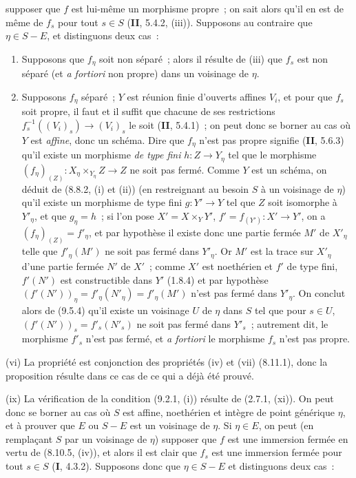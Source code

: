 
supposer que $f$ est lui-même un morphisme propre~; on sait alors qu'il en est
de même de $f_s$ pour tout $s\in S$ (\textbf{II}, 5.4.2, (iii)). Supposons au
contraire que $\eta\in S-E$, et distinguons deux cas~:

\begin{enumerate}[label=\upshape{$\arabic{enumi}^\circ$}]
  \item Supposons que $f_\eta$ soit non séparé~; alors il résulte de (iii) que
  $f_s$ est non séparé (et \emph{a fortiori} non propre) dans un voisinage de
  $\eta$.

  \item Supposons $f_\eta$ séparé~; $Y$ est réunion finie d'ouverts affines
  $V_i$, et pour que $f_s$ soit propre, il faut et il suffit que chacune de ses
  restrictions $f_s^{-1}((V_i)_s)\to(V_i)_s$ le soit (\textbf{II}, 5.4.1)~;
  on peut donc se borner au cas où $Y$ est \emph{affine}, donc un schéma. Dire
  que $f_\eta$ n'est pas propre signifie (\textbf{II}, 5.6.3) qu'il existe un
  morphisme \emph{de type fini} $h:Z\to Y_\eta$ tel que le morphisme
  $(f_\eta)_{(Z)}:X_\eta\times_{Y_\eta}Z\to Z$ ne soit pas fermé. Comme $Y$ est
  un schéma, on déduit de (8.8.2, (i) et (ii)) (en restreignant au besoin $S$ à
  un voisinage de $\eta$) qu'il existe un morphisme de type fini $g:Y'\to Y$
  tel que $Z$ soit isomorphe à $Y'_\eta$, et que $g_\eta=h$~; si l'on pose
  $X'=X\times_YY'$, $f'=f_{(Y')}:X'\to Y'$, on a
  $(f_\eta)_{(Z)}=f'_\eta$, et par hypothèse il existe donc une partie fermée
  $M'$ de $X'_\eta$ telle que $f'_\eta(M')$ ne soit pas fermé dans $Y'_\eta$.
  Or $M'$ est la trace sur $X'_\eta$ d'une partie fermée $N'$ de $X'$~; comme
  $X'$ est noethérien et $f'$ de type fini, $f'(N')$ est constructible dans
  $Y'$ (1.8.4) et par hypothèse
  $(f'(N'))_\eta=f'_\eta(N'_\eta)=f'_\eta(M')$ n'est pas fermé dans
  $Y'_\eta$. On conclut alors de (9.5.4) qu'il existe un voisinage $U$ de
  $\eta$ dans $S$ tel que pour $s\in U$,
  $(f'(N'))_s=f'_s(N'_s)$ ne soit pas fermé dans $Y'_s$~; autrement dit, le
  morphisme $f'_s$ n'est pas fermé, et \emph{a fortiori} le morphisme $f_s$
  n'est pas propre.
\end{enumerate}

(vi) La propriété est conjonction des propriétés (iv) et (vii) (8.11.1), donc
la proposition résulte dans ce cas de ce qui a déjà été prouvé.

(ix) La vérification de la condition (9.2.1, (i)) résulte de (2.7.1, (xi)). On
peut donc se borner au cas où $S$ est affine, noethérien et intègre de point
générique $\eta$, et à prouver que $E$ ou $S-E$ est un voisinage de $\eta$. Si
$\eta\in E$, on peut (en remplaçant $S$ par un voisinage de $\eta$) supposer
que $f$ est une immersion fermée en vertu de (8.10.5, (iv)), et alors il est
clair que $f_s$ est une immersion fermée pour tout $s\in S$ (\textbf{I},
4.3.2). Supposons donc que $\eta\in S-E$ et distinguons deux cas~:

